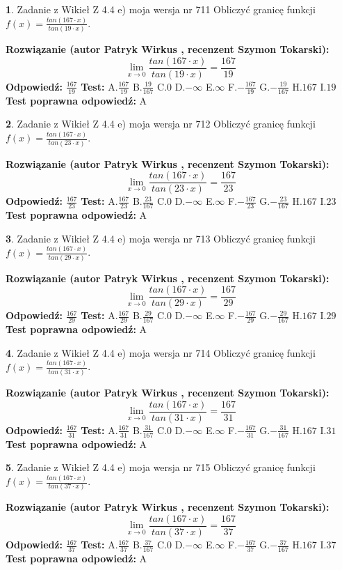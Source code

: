\documentclass[12pt, a4paper]{article}
\theoremstyle{definition} %
\newtheorem{zad}{}
\newcommand{\zadStart}[1]{\begin{zad}#1\newline}
\newcommand{\zadStop}{\end{zad}}
\newcommand{\rozwStart}[2]{\noindent \textbf{Rozwiązanie (autor #1 , recenzent #2): }\newline}
\newcommand{\rozwStop}{\newline}
\newcommand{\odpStart}{\noindent \textbf{Odpowiedź:}\newline}
\newcommand{\odpStop}{\newline}
\newcommand{\testStart}{\noindent \textbf{Test:}\newline}
\newcommand{\testStop}{\newline}
\newcommand{\kluczStart}{\noindent \textbf{Test poprawna odpowiedź:}\newline}
\newcommand{\kluczStop}{\newline}
\begin{document}
\zadStart{Zadanie z Wikieł Z 4.4 e) moja wersja nr 711}
Obliczyć granicę funkcji $f(x)=\frac{tan(167\cdot x)}{tan(19\cdot x)}$.
\zadStop
\rozwStart{Patryk Wirkus}{Szymon Tokarski}
$$\lim\limits_{x\to 0}\frac{tan(167\cdot x)}{tan(19\cdot x)}=
\frac{167}{19}$$
\rozwStop
\odpStart
$\frac{167}{19}$
\odpStop
\testStart
A.$\frac{167}{19}$
B.$\frac{19}{167}$
C.$0$
D.$-\infty$
E.$\infty$
F.$-\frac{167}{19}$
G.$-\frac{19}{167}$
H.$167$
I.$19$
\testStop
\kluczStart
A
\kluczStop



\zadStart{Zadanie z Wikieł Z 4.4 e) moja wersja nr 712}
Obliczyć granicę funkcji $f(x)=\frac{tan(167\cdot x)}{tan(23\cdot x)}$.
\zadStop
\rozwStart{Patryk Wirkus}{Szymon Tokarski}
$$\lim\limits_{x\to 0}\frac{tan(167\cdot x)}{tan(23\cdot x)}=
\frac{167}{23}$$
\rozwStop
\odpStart
$\frac{167}{23}$
\odpStop
\testStart
A.$\frac{167}{23}$
B.$\frac{23}{167}$
C.$0$
D.$-\infty$
E.$\infty$
F.$-\frac{167}{23}$
G.$-\frac{23}{167}$
H.$167$
I.$23$
\testStop
\kluczStart
A
\kluczStop



\zadStart{Zadanie z Wikieł Z 4.4 e) moja wersja nr 713}
Obliczyć granicę funkcji $f(x)=\frac{tan(167\cdot x)}{tan(29\cdot x)}$.
\zadStop
\rozwStart{Patryk Wirkus}{Szymon Tokarski}
$$\lim\limits_{x\to 0}\frac{tan(167\cdot x)}{tan(29\cdot x)}=
\frac{167}{29}$$
\rozwStop
\odpStart
$\frac{167}{29}$
\odpStop
\testStart
A.$\frac{167}{29}$
B.$\frac{29}{167}$
C.$0$
D.$-\infty$
E.$\infty$
F.$-\frac{167}{29}$
G.$-\frac{29}{167}$
H.$167$
I.$29$
\testStop
\kluczStart
A
\kluczStop



\zadStart{Zadanie z Wikieł Z 4.4 e) moja wersja nr 714}
Obliczyć granicę funkcji $f(x)=\frac{tan(167\cdot x)}{tan(31\cdot x)}$.
\zadStop
\rozwStart{Patryk Wirkus}{Szymon Tokarski}
$$\lim\limits_{x\to 0}\frac{tan(167\cdot x)}{tan(31\cdot x)}=
\frac{167}{31}$$
\rozwStop
\odpStart
$\frac{167}{31}$
\odpStop
\testStart
A.$\frac{167}{31}$
B.$\frac{31}{167}$
C.$0$
D.$-\infty$
E.$\infty$
F.$-\frac{167}{31}$
G.$-\frac{31}{167}$
H.$167$
I.$31$
\testStop
\kluczStart
A
\kluczStop



\zadStart{Zadanie z Wikieł Z 4.4 e) moja wersja nr 715}
Obliczyć granicę funkcji $f(x)=\frac{tan(167\cdot x)}{tan(37\cdot x)}$.
\zadStop
\rozwStart{Patryk Wirkus}{Szymon Tokarski}
$$\lim\limits_{x\to 0}\frac{tan(167\cdot x)}{tan(37\cdot x)}=
\frac{167}{37}$$
\rozwStop
\odpStart
$\frac{167}{37}$
\odpStop
\testStart
A.$\frac{167}{37}$
B.$\frac{37}{167}$
C.$0$
D.$-\infty$
E.$\infty$
F.$-\frac{167}{37}$
G.$-\frac{37}{167}$
H.$167$
I.$37$
\testStop
\kluczStart
A
\kluczStop
\end{document}
